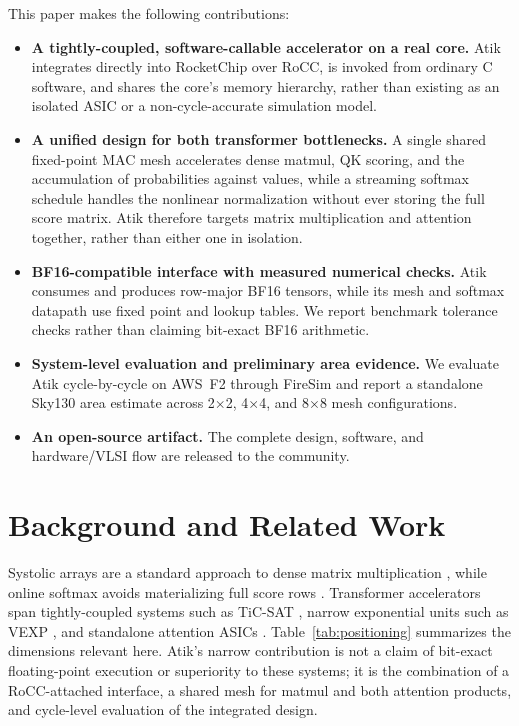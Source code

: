 \documentclass[sigconf,nonacm]{acmart}
\begin{document}
This paper makes the following contributions:
\begin{itemize}
  \item \textbf{A tightly-coupled, software-callable accelerator on a real
    core.} Atik integrates directly into RocketChip over RoCC, is invoked from
    ordinary C software, and shares the core's memory hierarchy, rather than
    existing as an isolated ASIC or a non-cycle-accurate simulation model.
  \item \textbf{A unified design for both transformer bottlenecks.} A single
    shared fixed-point MAC mesh accelerates dense matmul, QK scoring, and the
    accumulation of probabilities against values, while a streaming softmax
    schedule handles the nonlinear normalization without ever storing the full
    score matrix. Atik therefore targets matrix multiplication and attention
    together, rather than either one in isolation.
  \item \textbf{BF16-compatible interface with measured numerical checks.}
    Atik consumes and produces row-major BF16 tensors, while its mesh and
    softmax datapath use fixed point and lookup tables. We report benchmark
    tolerance checks rather than claiming bit-exact BF16 arithmetic.
  \item \textbf{System-level evaluation and preliminary area evidence.} We
    evaluate Atik cycle-by-cycle on AWS~F2 through FireSim and report a
    standalone Sky130 area estimate across 2$\times$2, 4$\times$4, and
    8$\times$8 mesh configurations.
  \item \textbf{An open-source artifact.} The complete design, software, and
    hardware/VLSI flow are released to the community.
\end{itemize}

\section{Background and Related Work}

Systolic arrays are a standard approach to dense matrix multiplication
\cite{sysArrKung,googletpu,gemmini}, while online softmax avoids materializing
full score rows \cite{onlinesoftmax,softermax}. Transformer accelerators span
tightly-coupled systems such as TiC-SAT \cite{ticsat}, narrow exponential units
such as VEXP \cite{vexp}, and standalone attention ASICs
\cite{ita,a3,elsa,sanger,energon}. Table~\ref{tab:positioning} summarizes the
dimensions relevant here. Atik's narrow contribution is not a claim of
bit-exact floating-point execution or superiority to these systems; it is the
combination of a RoCC-attached interface, a shared mesh for matmul and both
attention products, and cycle-level evaluation of the integrated design.
\end{document}

